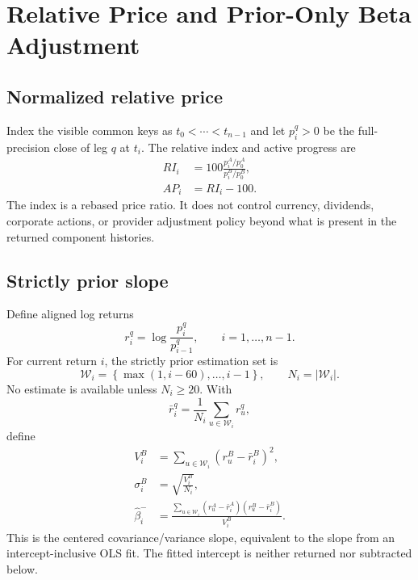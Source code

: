 \documentclass{article}
\begin{document}
\section{Relative Price and Prior-Only Beta Adjustment}

\subsection{Normalized relative price}

Index the visible common keys as $t_0<\cdots<t_{n-1}$ and let $p^q_i>0$ be the full-precision close of leg $q$ at $t_i$. The relative index and active progress are
\begin{align}
RI_i&=100
\frac{p^A_i/p^A_0}{p^B_i/p^B_0},
\label{eq:ri}\\
AP_i&=RI_i-100.
\label{eq:active}
\end{align}
The index is a rebased price ratio. It does not control currency, dividends, corporate actions, or provider adjustment policy beyond what is present in the returned component histories.

\subsection{Strictly prior slope}

Define aligned log returns
\begin{equation}
r^q_i=\log\frac{p^q_i}{p^q_{i-1}},
\qquad i=1,\ldots,n-1 .
\end{equation}
For current return $i$, the strictly prior estimation set is
\begin{equation}
\mathcal W_i=
\left\{\max(1,i-60),\ldots,i-1\right\},
\qquad N_i=|\mathcal W_i|.
\label{eq:beta-window}
\end{equation}
No estimate is available unless $N_i\ge20$. With
\begin{equation}
\bar r^q_i=\frac{1}{N_i}\sum_{u\in\mathcal W_i}r^q_u,
\end{equation}
define
\begin{align}
V^B_i&=\sum_{u\in\mathcal W_i}(r^B_u-\bar r^B_i)^2,\\
\sigma^B_i&=\sqrt{\frac{V^B_i}{N_i}},\\
\widehat\beta^-_i&=
\frac{\sum_{u\in\mathcal W_i}
(r^A_u-\bar r^A_i)(r^B_u-\bar r^B_i)}
{V^B_i}.
\label{eq:beta}
\end{align}
This is the centered covariance/variance slope, equivalent to the slope from an intercept-inclusive OLS fit. The fitted intercept is neither returned nor subtracted below.
\end{document}
